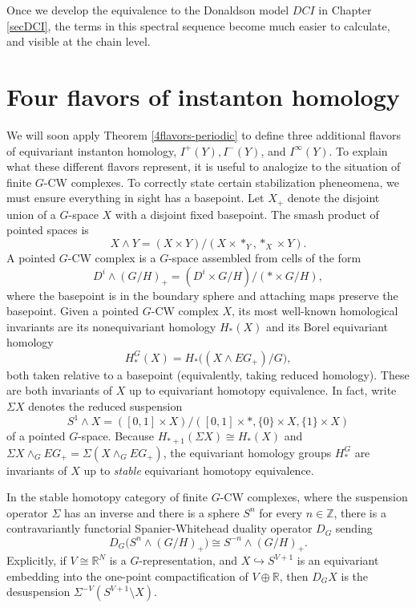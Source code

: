 \documentclass{memo-l}
\theoremstyle{definition}
\theoremstyle{remark}
\numberwithin{section}{chapter}
\numberwithin{equation}{chapter}
\begin{document}
Once we develop the equivalence to the Donaldson model $DCI$ in Chapter \ref{secDCI}, the terms in this spectral sequence become much easier to calculate, and visible at the chain level.

\section{Four flavors of instanton homology}\label{sec:fourflavors}
We will soon apply Theorem \ref{4flavors-periodic} to define three additional flavors of equivariant instanton homology, $I^+(Y), I^-(Y)$, and $I^\infty(Y)$. To explain what these different flavors represent, it is useful to analogize to the situation of finite $G$-CW complexes. To correctly state certain stabilization pheneomena, we must ensure everything in sight has a basepoint. Let $X_+$ denote the disjoint union of a $G$-space $X$ with a disjoint fixed basepoint. The smash product of pointed spaces is 
$$X \wedge Y = (X \times Y)\big/(X \times *_Y, *_X \times Y).$$ 
A pointed $G$-CW complex is a $G$-space assembled from cells of the form 
$$D^i \wedge (G/H)_+ = (D^i \times G/H)\big/(* \times G/H),$$ 
where the basepoint is in the boundary sphere and attaching maps preserve the basepoint. Given a pointed $G$-CW complex $X$, its most well-known homological invariants are its nonequivariant homology $H_*(X)$ and its Borel equivariant homology $$H_*^G(X) = H_*\big((X \wedge EG_+)/G\big),$$ both taken relative to a basepoint (equivalently, taking reduced homology). These are both invariants of $X$ up to equivariant homotopy equivalence. In fact, write $\Sigma X$ denotes the reduced suspension 
$$S^1 \wedge X = ([0,1] \times X)/([0,1] \times *, \{0\} \times X, \{1\} \times X)$$ 
of a pointed $G$-space. Because $H_{*+1}(\Sigma X) \cong H_*(X)$ and $\Sigma X \wedge_G EG_+ = \Sigma (X \wedge_G EG_+)$, the equivariant homology groups $H^G_*$ are invariants of $X$ up to \emph{stable} equivariant homotopy equivalence.

In the stable homotopy category of finite $G$-CW complexes, where the suspension operator $\Sigma$ has an inverse and there is a sphere $S^n$ for every $n \in \mathbb Z$, there is a contravariantly functorial Spanier-Whitehead duality operator $D_G$ sending $$D_G\big(S^n \wedge (G/H)_+\big) \cong S^{-n} \wedge (G/H)_+.$$ Explicitly, if $V \cong \mathbb R^N$ is a $G$-representation, and $X \hookrightarrow S^{V+1}$ is an equivariant embedding into the one-point compactification of $V \oplus \mathbb R$, then $D_GX$ is the desuspension $\Sigma^{-V}(S^{V+1} \setminus X)$.
\end{document}
